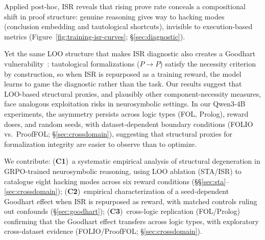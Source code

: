 Applied post-hoc, ISR reveals that rising prove rate conceals a compositional shift in proof structure: genuine reasoning gives way to hacking modes (conclusion embedding and tautological shortcuts), invisible to execution-based metrics (Figure~\ref{fig:training-isr-curves}; \S\ref{sec:diagnostic}).

Yet the same LOO structure that makes ISR diagnostic also creates a Goodhart vulnerability~\citep{manheim-goodhart-taxonomy, karwowski-goodhart-rl, gao-reward-overoptimization}: tautological formalizations ($P{\to}P$) satisfy the necessity criterion by construction, so when ISR is repurposed as a training reward, the model learns to game the diagnostic rather than the task.
Our results suggest that LOO-based structural proxies, and plausibly other component-necessity measures, face analogous exploitation risks in neurosymbolic settings.
In our Qwen3-4B experiments, the asymmetry persists across logic types (FOL, Prolog), reward doses, and random seeds, with dataset-dependent boundary conditions (FOLIO vs.\ ProofFOL; \S\ref{sec:crossdomain}), suggesting that structural proxies for formalization integrity are easier to observe than to optimize.

We contribute:
(\textbf{C1})~a systematic empirical analysis of structural degeneration in GRPO-trained neurosymbolic reasoning, using LOO ablation (STA/ISR) to catalogue eight hacking modes across six reward conditions (\S\S\ref{sec:sta}--\ref{sec:crossdomain});
(\textbf{C2})~empirical characterization of a seed-dependent Goodhart effect when ISR is repurposed as reward, with matched controls ruling out confounds (\S\ref{sec:goodhart});
(\textbf{C3})~cross-logic replication (FOL/Prolog) confirming that the Goodhart effect transfers across logic types, with exploratory cross-dataset evidence (FOLIO/ProofFOL; \S\ref{sec:crossdomain}).

